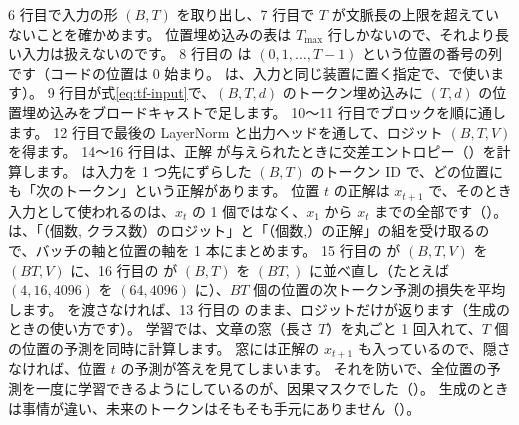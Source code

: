 
6 行目で入力の形 $(B,T)$ を取り出し、7 行目で $T$ が文脈長の上限を超えていないことを確かめます。
位置埋め込みの表は $T_{\max}$ 行しかないので、それより長い入力は扱えないのです。
8 行目の  は $(0,1,\dots,T-1)$ という位置の番号の列です（コードの位置は 0 始まり。 は、入力と同じ装置に置く指定で、で使います）。
9 行目が式\eqref{eq:tf-input}で、$(B,T,d)$ のトークン埋め込みに $(T,d)$ の位置埋め込みをブロードキャストで足します。
10〜11 行目でブロックを順に通します。
12 行目で最後の LayerNorm と出力ヘッドを通して、ロジット $(B,T,V)$ を得ます。
14〜16 行目は、正解  が与えられたときに交差エントロピー（）を計算します。
 は入力を 1 つ先にずらした $(B,T)$ のトークン ID で、どの位置にも「次のトークン」という正解があります。
位置 $t$ の正解は $x_{t+1}$ で、そのとき入力として使われるのは、$x_t$ の 1 個ではなく、$x_1$ から $x_t$ までの全部です（）。
 は、「（個数, クラス数）のロジット」と「（個数,）の正解」の組を受け取るので、バッチの軸と位置の軸を 1 本にまとめます。
15 行目の  が $(B,T,V)$ を $(BT, V)$ に、16 行目の  が $(B,T)$ を $(BT,)$ に並べ直し（たとえば $(4,16,4096)$ を $(64,4096)$ に）、$BT$ 個の位置の次トークン予測の損失を平均します。
 を渡さなければ、13 行目の  のまま、ロジットだけが返ります（生成のときの使い方です）。
学習では、文章の窓（長さ $T$）を丸ごと 1 回入れて、$T$ 個の位置の予測を同時に計算します。
窓には正解の $x_{t+1}$ も入っているので、隠さなければ、位置 $t$ の予測が答えを見てしまいます。
それを防いで、全位置の予測を一度に学習できるようにしているのが、因果マスクでした（）。
生成のときは事情が違い、未来のトークンはそもそも手元にありません（）。

